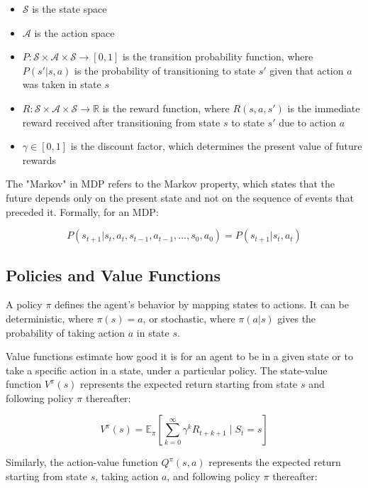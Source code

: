 \documentclass{article}
\begin{document}
\begin{itemize}
    \item $\mathcal{S}$ is the state space
    \item $\mathcal{A}$ is the action space
    \item $P: \mathcal{S} \times \mathcal{A} \times \mathcal{S} \rightarrow [0, 1]$ is the transition probability function, where $P(s' | s, a)$ is the probability of transitioning to state $s'$ given that action $a$ was taken in state $s$
    \item $R: \mathcal{S} \times \mathcal{A} \times \mathcal{S} \rightarrow \mathbb{R}$ is the reward function, where $R(s, a, s')$ is the immediate reward received after transitioning from state $s$ to state $s'$ due to action $a$
    \item $\gamma \in [0, 1]$ is the discount factor, which determines the present value of future rewards
\end{itemize}

The "Markov" in MDP refers to the Markov property, which states that the future depends only on the present state and not on the sequence of events that preceded it. Formally, for an MDP:

\begin{equation}
P(s_{t+1} | s_t, a_t, s_{t-1}, a_{t-1}, \ldots, s_0, a_0) = P(s_{t+1} | s_t, a_t)
\end{equation}

\subsection{Policies and Value Functions}

A policy $\pi$ defines the agent's behavior by mapping states to actions. It can be deterministic, where $\pi(s) = a$, or stochastic, where $\pi(a|s)$ gives the probability of taking action $a$ in state $s$.

Value functions estimate how good it is for an agent to be in a given state or to take a specific action in a state, under a particular policy. The state-value function $V^\pi(s)$ represents the expected return starting from state $s$ and following policy $\pi$ thereafter:

\begin{equation}
V^\pi(s) = \mathbb{E}_\pi\left[\sum_{k=0}^{\infty} \gamma^k R_{t+k+1} \mid S_t = s\right]
\end{equation}

Similarly, the action-value function $Q^\pi(s, a)$ represents the expected return starting from state $s$, taking action $a$, and following policy $\pi$ thereafter:
\end{document}
